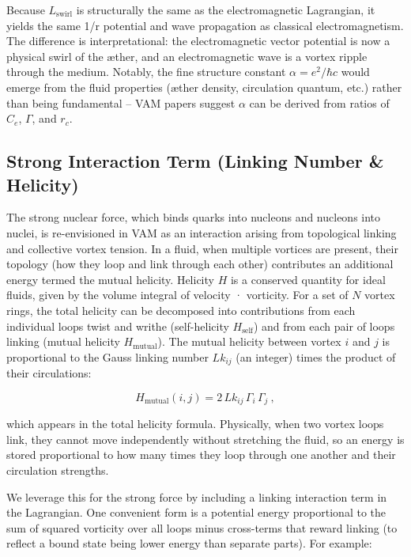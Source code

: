Because $L_{\text{swirl}}$ is structurally the same as the electromagnetic Lagrangian, it yields the same 1/r potential and wave propagation as classical electromagnetism. The difference is interpretational: the electromagnetic vector potential is now a physical swirl of the æther, and an electromagnetic wave is a vortex ripple through the medium. Notably, the fine structure constant $\alpha = e^2/\hbar c$ would emerge from the fluid properties (æther density, circulation quantum, etc.) rather than being fundamental – VAM papers suggest $\alpha$ can be derived from ratios of $C_e$, $\Gamma$, and $r_c$.


\subsection{Strong Interaction Term (Linking Number \& Helicity)}

The strong nuclear force, which binds quarks into nucleons and nucleons into nuclei, is re-envisioned in VAM as an interaction arising from topological linking and collective vortex tension. In a fluid, when multiple vortices are present, their topology (how they loop and link through each other) contributes an additional energy termed the mutual helicity. Helicity $H$ is a conserved quantity for ideal fluids, given by the volume integral of velocity · vorticity. For a set of $N$ vortex rings, the total helicity can be decomposed into contributions from each individual loop\rqs s twist and writhe (self-helicity $H_{\text{self}}$) and from each pair of loops linking (mutual helicity $H_{\text{mutual}}$). The mutual helicity between vortex $i$ and $j$ is proportional to the Gauss linking number $Lk_{ij}$ (an integer) times the product of their circulations:


\[
    H_{\text{mutual}}(i,j) = 2\,Lk_{ij}\,\Gamma_i\,\Gamma_j ~,
\]

which appears in the total helicity formula. Physically, when two vortex loops link, they cannot move independently without stretching the fluid, so an energy is stored proportional to how many times they loop through one another and their circulation strengths.


We leverage this for the strong force by including a linking interaction term in the Lagrangian. One convenient form is a potential energy proportional to the sum of squared vorticity over all loops minus cross-terms that reward linking (to reflect a bound state being lower energy than separate parts). For example:

